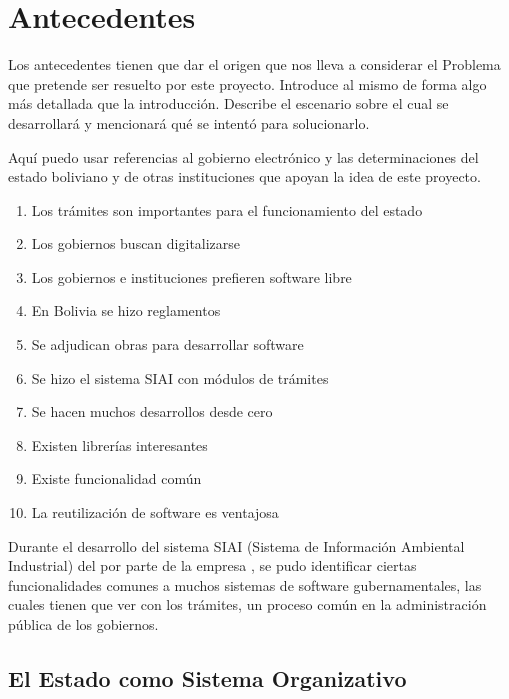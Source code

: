 \section{Antecedentes}

\begin{tcolorbox}[breakable]

    Los antecedentes tienen que dar el origen que nos lleva a considerar el Problema que pretende ser resuelto por este proyecto. Introduce al mismo de forma algo más detallada que la introducción.  Describe el escenario sobre el cual se desarrollará y mencionará qué se intentó para solucionarlo.

    Aquí puedo usar referencias al gobierno electrónico y las determinaciones del estado boliviano y de otras instituciones que apoyan la idea de este proyecto.

    \begin{enumerate}
        \item Los trámites son importantes para el funcionamiento del estado
        \item Los gobiernos buscan digitalizarse
        \item Los gobiernos e instituciones prefieren software libre
        \item En Bolivia se hizo reglamentos
        \item Se adjudican obras para desarrollar software
        \item Se hizo el sistema SIAI con módulos de trámites
        \item Se hacen muchos desarrollos desde cero
        \item Existen librerías interesantes
        \item Existe funcionalidad común
        \item La reutilización de software es ventajosa
    \end{enumerate}

\end{tcolorbox}

Durante el desarrollo del sistema SIAI (Sistema de Información Ambiental Industrial) del  por parte de la empresa ,
se pudo identificar ciertas funcionalidades comunes a muchos sistemas de software gubernamentales,
las cuales tienen que ver con los trámites, un proceso común en la administración pública de los gobiernos.

\subsection{El Estado como Sistema Organizativo}

